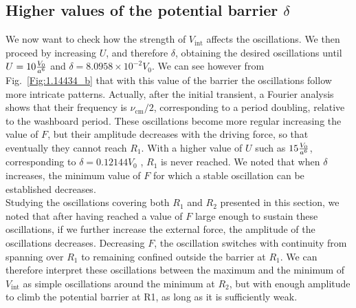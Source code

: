 \subsection{Higher values of the potential barrier $\delta$}
We now want to check how the strength of $V_\text{int}$ affects the oscillations. We then proceed by increasing $U$, and therefore $\delta$, obtaining the desired oscillations until $U=10 \frac{V_0}{a^6}$ and $\delta =  8.0958\times 10^{-2} V_0$. We can see however from Fig.~\ref{Fig:1.14434_b} that with this value of the barrier the oscillations follow more intricate patterns. Actually, after the initial transient, a Fourier analysis shows that their frequency is $\nu_\text{cm}/2$, corresponding to a period doubling, relative to the washboard period. These oscillations become more regular increasing the value of $F$, but their amplitude decreases with the driving force, so that eventually they cannot reach $R_1$. With a higher value of $U$ such as $15 \frac{V_0}{a^6}$, corresponding to $\delta = 0.12144 V_0$ , $R_1$ is never reached. 
We noted that when $\delta$ increases, the minimum value of $F$ for which a stable oscillation can be established decreases. \\

Studying the oscillations covering both $R_1$ and $R_2$ presented in this section, we noted that after having reached a value of $F$ large enough to sustain these oscillations, if we further increase the external force, the amplitude of the oscillations decreases. Decreasing $F$, the oscillation switches with continuity from spanning over $R_1$ to remaining confined outside the barrier at $R_1$. We can therefore interpret these oscillations between the maximum and the minimum of $V_\text{int}$ as simple oscillations around the minimum at $R_2$, but with enough amplitude to climb the potential barrier at R1, as long as it is sufficiently weak.


 
